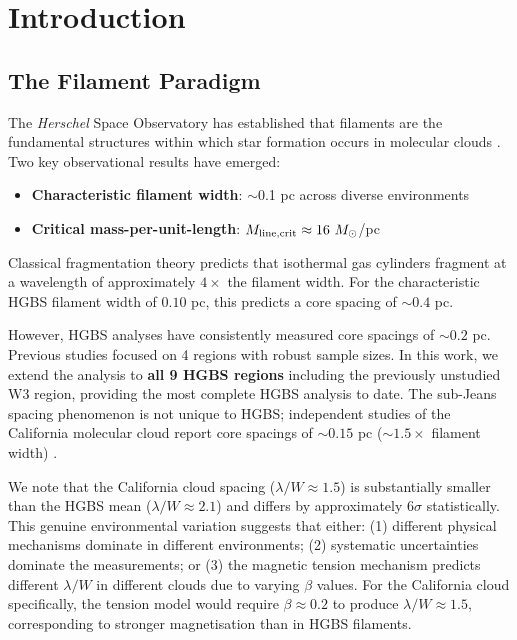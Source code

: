 \documentclass[11pt,a4paper]{article}
\begin{document}
\section{Introduction}

\subsection{The Filament Paradigm}

The \textit{Herschel} Space Observatory has established that filaments are the fundamental structures within which star formation occurs in molecular clouds \citep{Andre2010}. Two key observational results have emerged:

\begin{itemize}
    \item \textbf{Characteristic filament width}: $\sim$0.1 pc across diverse environments \citep{Arzoumanian2011}
    \item \textbf{Critical mass-per-unit-length}: $M_{\rm line,crit} \approx 16~M_\odot$/pc \citep{Ostriker1964}
\end{itemize}

Classical fragmentation theory \citep{Inutsuka1992} predicts that isothermal gas cylinders fragment at a wavelength of approximately $4\times$ the filament width. For the characteristic HGBS filament width of $0.10$ pc, this predicts a core spacing of $\sim0.4$ pc.

However, HGBS analyses have consistently measured core spacings of $\sim0.2$ pc. Previous studies focused on 4 regions with robust sample sizes. In this work, we extend the analysis to \textbf{all 9 HGBS regions} including the previously unstudied W3 region, providing the most complete HGBS analysis to date. The sub-Jeans spacing phenomenon is not unique to HGBS; independent studies of the California molecular cloud report core spacings of $\sim0.15$ pc ($\sim1.5\times$ filament width) \citep{Zhang2024}.

We note that the California cloud spacing ($\lambda/W \approx 1.5$) is substantially smaller than the HGBS mean ($\lambda/W \approx 2.1$) and differs by approximately $6\sigma$ statistically. This genuine environmental variation suggests that either: (1) different physical mechanisms dominate in different environments; (2) systematic uncertainties dominate the measurements; or (3) the magnetic tension mechanism predicts different $\lambda/W$ in different clouds due to varying $\beta$ values. For the California cloud specifically, the tension model would require $\beta \approx 0.2$ to produce $\lambda/W \approx 1.5$, corresponding to stronger magnetisation than in HGBS filaments.
\end{document}
